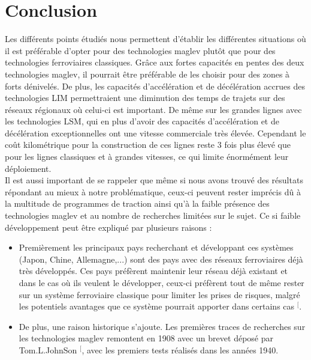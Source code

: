 \documentclass[12pt, a4paper, onecolumn]{article}
\makeatletter
\renewcommand{\tab}{\tabto{15px}}
\newcommand{\csvdel}{}
\newcommand{\bettercite}[1][,]{%
  \renewcommand{\csvdel}{\renewcommand{\csvdel}{}}%
  \csname\endcsname$^[$\checknextarg}
\newcommand{\checknextarg}{\@ifnextchar\bgroup{\gobblenext}{}}%
\newcommand{\gobblenext}[1]{\csvdel\textcolor{blue}{\textbf{\cite{#1}}}\@ifnextchar\bgroup{$^,$\gobblenext}{$^]$}}%
\makeatother
\begin{document}
\pagebreak %
\section*{Conclusion}
\tab Les différents points étudiés nous permettent d’établir les différentes situations où il est préférable d’opter pour des technologies maglev plutôt que pour des technologies ferroviaires classiques.
Grâce aux fortes capacités en pentes des deux technologies maglev, il pourrait être préférable de les choisir pour des zones à forts dénivelés.
De plus, les capacités d’accélération et de décélération accrues des technologies LIM permettraient une diminution des temps de trajets sur des réseaux régionaux où celui-ci est important.
De même sur les grandes lignes avec les technologies LSM, qui en plus d’avoir des capacités d’accélération et de décélération exceptionnelles ont une vitesse commerciale très élevée.
Cependant le coût kilométrique pour la construction de ces lignes reste 3 fois plus élevé que pour les lignes classiques et à grandes vitesses, ce qui limite énormément leur déploiement. \\
\linebreak
\tab Il est aussi important de se rappeler que même si nous avons trouvé des résultats répondant au mieux à notre problématique, ceux-ci peuvent rester imprécis dû à la multitude de programmes de traction ainsi qu’à la faible présence des technologies maglev et au nombre de recherches limitées sur le sujet.
Ce si faible développement peut être expliqué par plusieurs raisons : \\
\begin{itemize}
  \item Premièrement les principaux pays recherchant et développant ces systèmes (Japon, Chine, Allemagne,...) sont des pays avec des réseaux ferroviaires déjà très développés. Ces pays préfèrent maintenir leur réseau déjà existant et dans le cas où ils veulent le développer, ceux-ci préfèrent tout de même rester sur un système ferroviaire classique pour limiter les prises de risques, malgré les potentiels avantages que ce système pourrait apporter dans certains cas\bettercite{maglevus}.
  \item De plus, une raison historique s’ajoute. Les premières traces de recherches sur les technologies maglev remontent en 1908 avec un brevet déposé par Tom.L.JohnSon\bettercite{firstpatent}, avec les premiers tests réalisés dans les années 1940.
\end{itemize}
\end{document}
